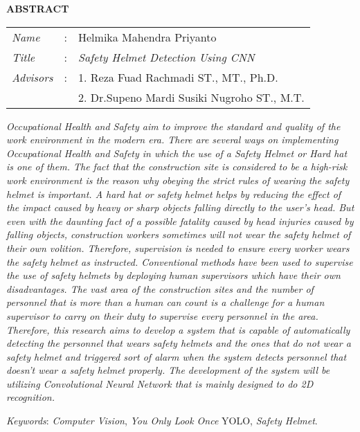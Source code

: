 \begin{center}
  \large\textbf{ABSTRACT}
\end{center}


\vspace{2ex}

\begingroup
  \setlength{\tabcolsep}{0pt}

  \noindent
  \begin{tabularx}{\textwidth}{l >{\centering}m{3em} X}
    \emph{Name}     &:& Helmika Mahendra Priyanto \\

    \emph{Title}    &:& \emph{Safety Helmet Detection Using CNN} \\

    \emph{Advisors} &:& 1. Reza Fuad Rachmadi ST., MT., Ph.D. \\
                    & & 2. Dr.Supeno Mardi Susiki Nugroho ST., M.T. \\
  \end{tabularx}
\endgroup

\emph{
  Occupational Health and Safety aim to improve the standard and quality of the work environment in the modern era. There are several ways on implementing Occupational Health and Safety in which the use of a Safety Helmet or Hard hat is one of them. The fact that the construction site is considered to be a high-risk work environment is the reason why obeying the strict rules of wearing the safety helmet is important. A hard hat or safety helmet helps by reducing the effect of the impact caused by heavy or sharp objects falling directly to the user’s head. But even with the daunting fact of a possible fatality caused by head injuries caused by falling objects, construction workers sometimes will not wear the safety helmet of their own volition. Therefore, supervision is needed to ensure every worker wears the safety helmet as instructed. Conventional methods have been used to supervise the use of safety helmets by deploying human supervisors which have their own disadvantages. The vast area of the construction sites and the number of personnel that is more than a human can count is a challenge for a human supervisor to carry on their duty to supervise every personnel in the area. Therefore, this research aims to develop a system that is capable of automatically detecting the personnel that wears safety helmets and the ones that do not wear a safety helmet and triggered sort of alarm when the system detects personnel that doesn’t wear a safety helmet properly. The development of the system will be utilizing Convolutional Neural Network that is mainly designed to do 2D recognition. }

\emph{Keywords}: \emph{Computer Vision}, \emph{You Only Look Once} YOLO, \emph{Safety Helmet}.

